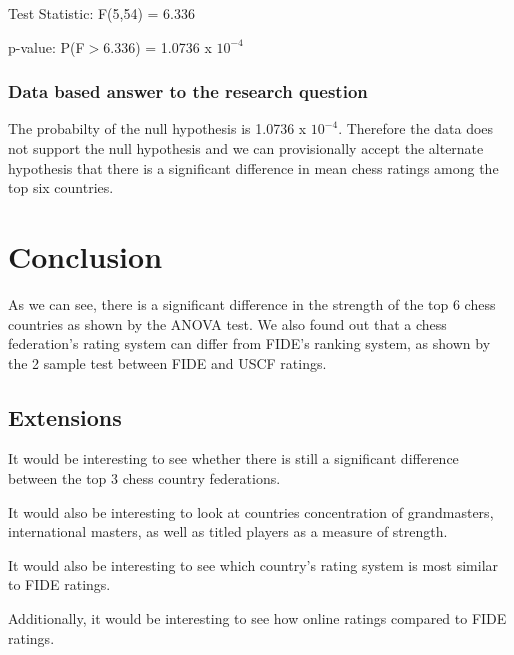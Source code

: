 \documentclass[12pt, titlepage]{article}
\begin{document}
Test Statistic: F(5,54) = 6.336

p-value: P(F\(>\)6.336) = 1.0736 x \(10^{-4}\)

\subsubsection{Data based answer to the research question}
The probabilty of the null hypothesis is 1.0736 x \(10^{-4}\). Therefore the data does not support the null hypothesis and we can provisionally accept the alternate hypothesis that there is a significant difference in mean chess ratings among the top six countries.

\section{Conclusion}
As we can see, there is a significant difference in the strength of the top 6 chess countries as shown by the ANOVA test. We also found out that a chess federation's rating system can differ from FIDE's ranking system, as shown by the 2 sample test between FIDE and USCF ratings. 

\subsection{Extensions}
It would be interesting to see whether there is still a significant difference between the top 3 chess country federations.

It would also be interesting to look at countries concentration of grandmasters, international masters, as well as titled players as a measure of strength. 

It would also be interesting to see which country's rating system is most similar to FIDE ratings.

Additionally, it would be interesting to see how online ratings compared to FIDE ratings.



\end{document}
